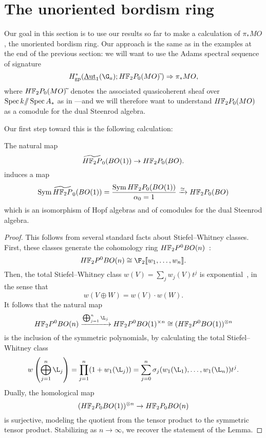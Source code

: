 \section{The unoriented bordism ring}\label{PiStarMOSection}

Our goal in this section is to use our results so far to make a calculation of \(\pi_* MO\), the unoriented bordism ring.  Our approach is the same as in the examples at the end of the previous section: we will want to use the Adams spectral sequence of signature \[H^*_{\mathrm{gp}}(\InternalAut_1(\G_a); \HFtwo P_0(MO)\widetilde{\:}) \Rightarrow \pi_* MO,\] where \(\HFtwo P_0(MO)\widetilde{\:}\) denotes the associated quasicoherent sheaf over \(\operatorname{Spec} k /\!\!/ \operatorname{Spec} A_*\) as in ---and we will therefore want to understand \(\HFtwo P_0(MO)\) as a comodule for the dual Steenrod algebra.

Our first step toward this is the following calculation:
\begin{lemma}\label{HF2BOIsSymAlg}
The natural map \[\widetilde{\HFtwo P}_0(BO(1)) \to \HFtwo P_0(BO).\] induces a map \[\Sym \widetilde{\HFtwo P}_0(BO(1)) = \frac{\Sym \HFtwo P_0(BO(1))}{\alpha_0 = 1} \xrightarrow{\simeq} \HFtwo P_0(BO)\] which is an isomorphism of Hopf algebras and of comodules for the dual Steenrod algebra.
\end{lemma}
\begin{proof}
This follows from several standard facts about Stiefel--Whitney classes.  First, these classes generate the cohomology ring \(\HFtwo P^0 BO(n)\)~\cite[Theorem 16.10]{Switzer}: \[\HFtwo P^0 BO(n) \cong \F_2\ps{w_1, \ldots, w_n}.\]  Then, the total Stiefel--Whitney class \(w(V) = \sum_j w_j(V) t^j\) is exponential~\cite[Theorem 16.3]{Switzer}, in the sense that \[w(V \oplus W) = w(V) \cdot w(W).\]  It follows that the natural map \[\HFtwo P^0 BO(n) \xrightarrow{\bigoplus_{j=1}^n \L_j} \HFtwo P^0 BO(1)^{\times n} \cong (\HFtwo P^0 BO(1))^{\otimes n}\] is the inclusion of the symmetric polynomials, by calculating the total Stiefel--Whitney class \[w\left( \bigoplus_{j=1}^n \L_j \right) = \prod_{j=1}^n (1 + w_1(\L_j)) = \sum_{j=0}^n \sigma_j(w_1(\L_1), \ldots, w_1(\L_n)) t^j.\]  Dually, the homological map \[(\HFtwo P_0 BO(1))^{\otimes n} \to \HFtwo P_0 BO(n)\] is surjective, modeling the quotient from the tensor product to the symmetric tensor product.  Stabilizing as \(n \to \infty\), we recover the statement of the Lemma.
\end{proof}

